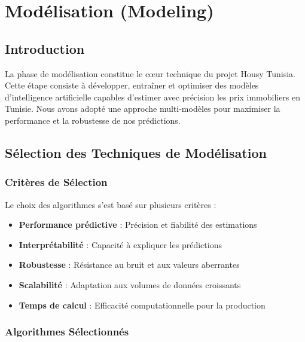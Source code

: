 
\chapter{Modélisation (Modeling)}
\label{chap:modeling}

\section{Introduction}

La phase de modélisation constitue le cœur technique du projet Housy Tunisia. Cette étape consiste à développer, entraîner et optimiser des modèles d'intelligence artificielle capables d'estimer avec précision les prix immobiliers en Tunisie. Nous avons adopté une approche multi-modèles pour maximiser la performance et la robustesse de nos prédictions.

\section{Sélection des Techniques de Modélisation}

\subsection{Critères de Sélection}

Le choix des algorithmes s'est basé sur plusieurs critères :

\begin{itemize}
    \item \textbf{Performance prédictive} : Précision et fiabilité des estimations
    \item \textbf{Interprétabilité} : Capacité à expliquer les prédictions
    \item \textbf{Robustesse} : Résistance au bruit et aux valeurs aberrantes
    \item \textbf{Scalabilité} : Adaptation aux volumes de données croissants
    \item \textbf{Temps de calcul} : Efficacité computationnelle pour la production
\end{itemize}

\subsection{Algorithmes Sélectionnés}

